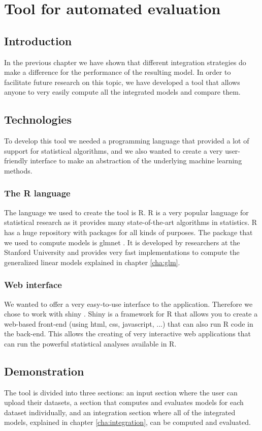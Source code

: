 \chapter{Tool for automated evaluation}
\label{cha:tool}

\section{Introduction}
\label{sec:tool-introduction}
In the previous chapter we have shown that different integration strategies do make a difference for the performance of the resulting model. In order to facilitate future research on this topic, we have developed a tool that allows anyone to very easily compute all the integrated models and compare them.
\section{Technologies}
\label{sec:tool-technologies}
To develop this tool we needed a programming language that provided a lot of support for statistical algorithms, and we also wanted to create a very user-friendly interface to make an abstraction of the underlying machine learning methods.
\subsection{The R language}
The language we used to create the tool is R. R is a very popular language for statistical research as it provides many state-of-the-art algorithms in statistics. R has a huge repository with packages for all kinds of purposes. The package that we used to compute models is glmnet \cite{glmnetvignette}. It is developed by researchers at the Stanford University and provides very fast implementations to compute the generalized linear models explained in chapter \ref{cha:glm}. 
\subsection{Web interface}
We wanted to offer a very easy-to-use interface to the application. Therefore we chose to work with shiny \cite{shiny}. Shiny is a framework for R that allows you to create a web-based front-end (using html, css, javascript, ...) that can also run R code in the back-end. This allows the creating of very interactive web applications that can run the powerful statistical analyses available in R.
\section{Demonstration}
\label{sec:tool-demonstration}
The tool is divided into three sections: an input section where the user can upload their datasets, a section that computes and evaluates models for each dataset individually, and an integration section where all of the integrated models, explained in chapter \ref{cha:integration}, can be computed and evaluated.
